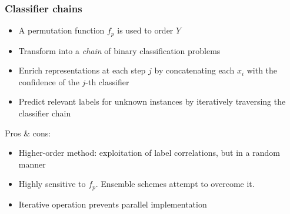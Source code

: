 \documentclass{beamer}
\begin{document}
\begin{frame}
\frametitle{Classifier chains}
\begin{itemize}
	\item A permutation function $f_p$ is used to order $Y$
	\item Transform into a \emph{chain} of binary classification problems
	\item Enrich representations at each step $j$ by concatenating each $x_i$ with the confidence of the $j$-th classifier
	\item Predict relevant labels for unknown instances by iteratively traversing the classifier chain
\end{itemize}

Pros \& cons:
\begin{itemize}
	\item Higher-order method: exploitation of label correlations, but in a random manner
	\item Highly sensitive to $f_p$. Ensemble schemes attempt to overcome it. 
	\item Iterative operation prevents parallel implementation
\end{itemize}
\end{frame}
\end{document}
